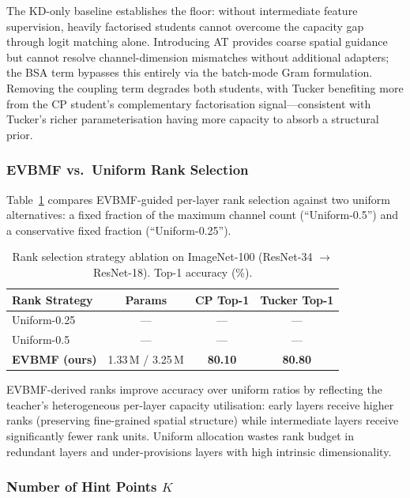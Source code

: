 \documentclass[conference]{IEEEtran}
\begin{document}
The KD-only baseline establishes the floor: without intermediate feature
supervision, heavily factorised students cannot overcome the capacity gap
through logit matching alone. Introducing AT provides coarse spatial guidance
but cannot resolve channel-dimension mismatches without additional adapters;
the BSA term bypasses this entirely via the batch-mode Gram formulation.
Removing the coupling term degrades both students, with Tucker benefiting
more from the CP student's complementary factorisation signal—consistent
with Tucker's richer parameterisation having more capacity to absorb a
structural prior.

\subsubsection{EVBMF vs.\ Uniform Rank Selection}

Table~\ref{tab:ablation_rank} compares EVBMF-guided per-layer rank selection
against two uniform alternatives: a fixed fraction of the maximum channel
count (``Uniform-0.5'') and a conservative fixed fraction (``Uniform-0.25'').

\begin{table}[t]
  \centering
  \caption{Rank selection strategy ablation on ImageNet-100
    (ResNet-34 $\to$ ResNet-18). Top-1 accuracy (\%).}
  \label{tab:ablation_rank}
  \begin{tabular}{lccc}
    \toprule
    \textbf{Rank Strategy} & \textbf{Params} & \textbf{CP Top-1} & \textbf{Tucker Top-1} \\
    \midrule
    Uniform-0.25          & —                & — & — \\
    Uniform-0.5           & —                & — & — \\
    \textbf{EVBMF (ours)} & 1.33\,M / 3.25\,M & \textbf{80.10} & \textbf{80.80} \\
    \bottomrule
  \end{tabular}
\end{table}

EVBMF-derived ranks improve accuracy over uniform ratios by reflecting the
teacher's heterogeneous per-layer capacity utilisation: early layers receive
higher ranks (preserving fine-grained spatial structure) while intermediate
layers receive significantly fewer rank units. Uniform allocation wastes rank
budget in redundant layers and under-provisions layers with high intrinsic
dimensionality.

\subsubsection{Number of Hint Points $K$}
\end{document}
